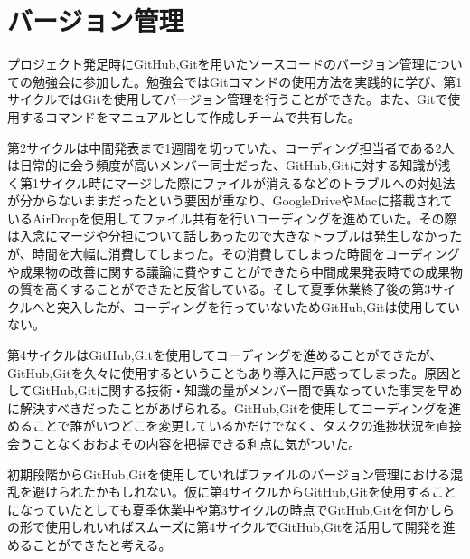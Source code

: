 \section{バージョン管理}
プロジェクト発足時にGitHub,Gitを用いたソースコードのバージョン管理についての勉強会に参加した。勉強会ではGitコマンドの使用方法を実践的に学び、第1サイクルではGitを使用してバージョン管理を行うことができた。また、Gitで使用するコマンドをマニュアルとして作成しチームで共有した。
\par 第2サイクルは中間発表まで1週間を切っていた、コーディング担当者である2人は日常的に会う頻度が高いメンバー同士だった、GitHub,Gitに対する知識が浅く第1サイクル時にマージした際にファイルが消えるなどのトラブルへの対処法が分からないままだったという要因が重なり、GoogleDriveやMacに搭載されているAirDropを使用してファイル共有を行いコーディングを進めていた。その際は入念にマージや分担について話しあったので大きなトラブルは発生しなかったが、時間を大幅に消費してしまった。その消費してしまった時間をコーディングや成果物の改善に関する議論に費やすことができたら中間成果発表時での成果物の質を高くすることができたと反省している。そして夏季休業終了後の第3サイクルへと突入したが、コーディングを行っていないためGitHub,Gitは使用していない。
\par 第4サイクルはGitHub,Gitを使用してコーディングを進めることができたが、GitHub,Gitを久々に使用するということもあり導入に戸惑ってしまった。原因としてGitHub,Gitに関する技術・知識の量がメンバー間で異なっていた事実を早めに解決すべきだったことがあげられる。GitHub,Gitを使用してコーディングを進めることで誰がいつどこを変更しているかだけでなく、タスクの進捗状況を直接会うことなくおおよその内容を把握できる利点に気がついた。
\par  初期段階からGitHub,Gitを使用していればファイルのバージョン管理における混乱を避けられたかもしれない。仮に第4サイクルからGitHub,Gitを使用することになっていたとしても夏季休業中や第3サイクルの時点でGitHub,Gitを何かしらの形で使用しれいればスムーズに第4サイクルでGitHub,Gitを活用して開発を進めることができたと考える。
